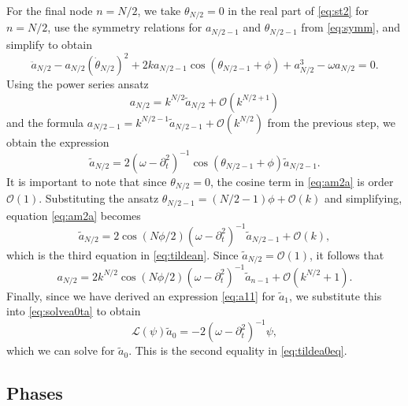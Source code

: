 \documentclass[11pt,reqno]{amsart}
\def\calL{{\mathcal L}}
\begin{document}
For the final node $n=N/2$, we take $\theta_{N/2} = 0$ in the real part of \cref{eq:st2} for $n = N/2$, use the symmetry relations for $a_{N/2-1}$ and $\theta_{N/2-1}$ from \cref{eq:symm}, and simplify to obtain
\begin{equation}\label{eq:oppcore}
\ddot a_{N/2} - a_{N/2} (\dot \theta_{N/2})^2 + 
2 k a_{N/2-1}\cos( \theta_{N/2-1} + \phi) + a_{N/2}^3 - \omega a_{N/2} = 0.
\end{equation}
Using the power series ansatz
\[
a_{N/2} = k^{N/2} \widetilde{a}_{N/2} + \mathcal{O}(k^{N/2+1})
\]
and the formula $a_{N/2-1} = k^{N/2-1} \widetilde{a}_{N/2-1} + \mathcal{O}(k^{N/2})$ from the previous step, we obtain the expression
\begin{equation}\label{eq:am2a}
\widetilde{a}_{N/2} = 2 (\omega - \partial_t^2)^{-1}\cos( \theta_{N/2-1} + \phi) \widetilde{a}_{N/2-1}.
\end{equation}
It is important to note that since $\theta_{N/2} = 0$, the cosine term in \cref{eq:am2a} is order $\mathcal{O}(1)$. Substituting the ansatz $\theta_{N/2-1} = (N/2-1)\phi + \mathcal{O}(k)$ and simplifying, equation \cref{eq:am2a} becomes
\begin{equation}\label{eq:am2}
\widetilde{a}_{N/2} = 2 \cos( N\phi/2)(\omega - \partial_t^2)^{-1} \widetilde{a}_{N/2-1} + \mathcal{O}(k),
\end{equation}
which is the third equation in \cref{eq:tildean}. Since $\widetilde{a}_{N/2} = \mathcal{O}(1)$, it follows that
\begin{equation}\label{eq:am2eq}
a_{N/2} = 2 k^{N/2} \cos\left( N\phi / 2\right) (\omega - \partial_t^2)^{-1} \widetilde{a}_{n-1} + \mathcal{O}(k^{N/2}+1).
\end{equation}
Finally, since we have derived an expression \cref{eq:a11} for $\widetilde{a}_1$, we substitute this into \cref{eq:solvea0ta} to obtain 
\[
\calL(\psi) \widetilde{a}_0 = -2 (\omega - \partial_t^2)^{-1} \psi,
\]
which we can solve for $\widetilde{a}_0$. This is the second equality in \cref{eq:tildea0eq}.

\subsection{Phases}
\end{document}
